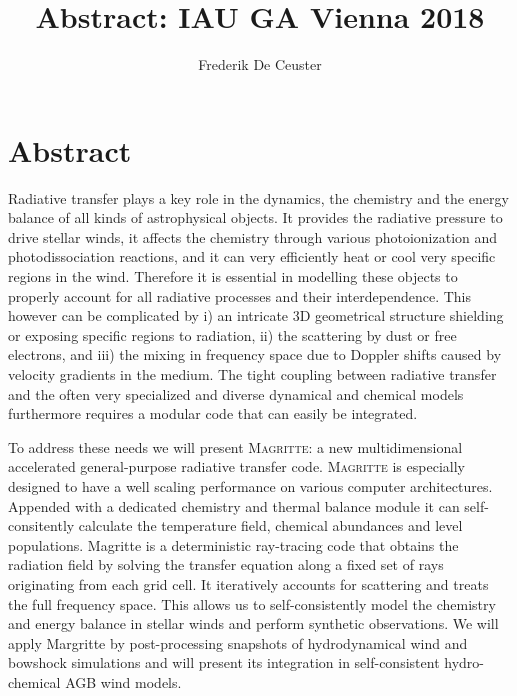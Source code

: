 \documentclass[]{article}
\title{Abstract: IAU GA Vienna 2018}
\author{\Large Frederik De Ceuster}
\date{}
\begin{document}
\section*{Abstract}

	Radiative transfer plays a key role in the dynamics, the chemistry and the energy balance of all kinds of astrophysical objects. It provides the radiative pressure to drive stellar winds, it affects the chemistry through various photoionization and photodissociation reactions, and it can very efficiently heat or cool very specific regions in the wind. Therefore it is essential in modelling these objects to properly account for all radiative processes and their interdependence. This however can be complicated by i) an intricate 3D geometrical structure shielding or exposing specific regions to radiation, ii) the scattering by dust or free electrons, and iii) the mixing in frequency space due to Doppler shifts caused by velocity gradients in the medium. The tight coupling between radiative transfer and the often very specialized and diverse dynamical and chemical models furthermore requires a modular code that can easily be integrated.

  \bigskip

  To address these needs we will present \textsc{Magritte}: a new multidimensional accelerated general-purpose radiative transfer code. \textsc{Magritte} is especially designed to have a well scaling performance on various computer architectures.  Appended with a dedicated chemistry and thermal balance module it can self-consitently calculate the temperature field, chemical abundances and level populations. Magritte is a deterministic ray-tracing code that obtains the radiation field by solving the transfer equation along a fixed set of rays originating from each grid cell. It iteratively accounts for scattering and treats the full frequency space. This allows us to self-consistently model the chemistry and energy balance in stellar winds and perform synthetic observations. We will apply {\sc Margritte} by post-processing snapshots of hydrodynamical wind and bowshock simulations and will present its integration in self-consistent hydro-chemical AGB wind models.
\end{document}
